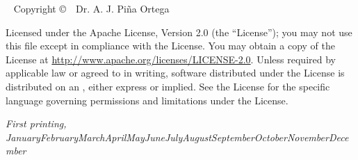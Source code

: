 \documentclass{tufte-book} %
\newcommand{\monthyear}{\ifcase\month\or January\or February\or March\or April\or May\or June\or July\or August\or September\or October\or November\or December\fi\space\number\year} %
\begin{document}
\newpage
\begin{fullwidth}
~\vfill
\thispagestyle{empty}
\setlength{\parindent}{0pt}
\setlength{\parskip}{\baselineskip}
Copyright \copyright\ \the\year\ Dr. A. J. Pi\~{n}a Ortega

\par{}

\par{}

\par Licensed under the Apache License, Version 2.0 (the ``License''); you may not
use this file except in compliance with the License. You may obtain a copy
of the License at \url{http://www.apache.org/licenses/LICENSE-2.0}. Unless
required by applicable law or agreed to in writing, software distributed
under the License is distributed on an , either express or implied. See the
License for the specific language governing permissions and limitations
under the License.

\par\textit{First printing, \monthyear}
\end{fullwidth}


\tableofcontents %


\listoffigures %


\listoftables %



\end{document}
